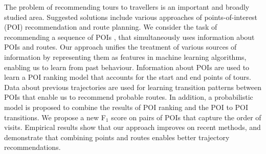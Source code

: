 
The problem of recommending tours to travellers is an important and broadly studied area.
Suggested solutions include various approaches of points-of-interest (POI)
recommendation and route planning.
We consider the task of recommending a sequence of POIs 
, that simultaneously uses information about POIs and routes.
Our approach unifies the treatment of various sources of information
by representing them as features in machine learning algorithms, enabling us to
learn from past behaviour. %
Information about POIs are used to learn a POI ranking model
that accounts for the start and end points of tours.
Data about previous trajectories are used for learning transition patterns between POIs that
enable us to recommend probable routes.
In addition, a probabilistic model is proposed
to combine the results of POI ranking and the POI to POI transitions.
We propose a new F$_1$ score on pairs of POIs
that capture the order of visits.
Empirical results show that our approach improves on
recent methods, and demonstrate that
combining points and routes enables better trajectory recommendations.
